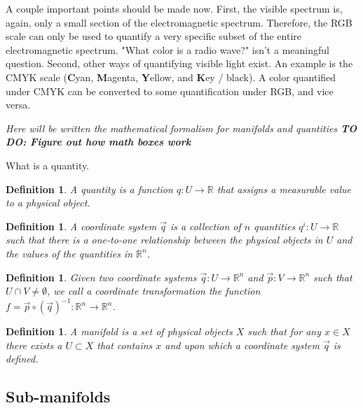 \documentclass{book}
\newtheorem{defn}[equation]{Definition}
\begin{document}
A couple important points should be made now. First, the visible spectrum is, again, only a small section of the electromagnetic spectrum. Therefore, the RGB scale can only be used to quantify a very specific subset of the entire electromagnetic spectrum. "What color is a radio wave?" isn't a meaningful question. Second, other ways of quantifying visible light exist. An example is the CMYK scale (\textbf{C}yan, \textbf{M}agenta, \textbf{Y}ellow, and \textbf{K}ey / black). A color quantified under CMYK can be converted to some quantification under RGB, and vice versa. 

\emph{Here will be written the mathematical formalism for manifolds and quantities
	\textbf{TO DO: Figure out how math boxes work}}


What is a quantity.

\begin{defn}
	A quantity is a function $q : U \to \mathbb{R}$ that assigns a measurable value to a physical object.
\end{defn}

\begin{defn}
	A coordinate system $\vec{q}$ is a collection of $n$ quantities $q^i : U \to \mathbb{R}$ such that there is a one-to-one relationship between the physical objects in $U$ and the values of the quantities in $\mathbb{R}^n$.
\end{defn}

\begin{defn}
	Given two coordinate systems  $\vec{q} : U \to \mathbb{R}^n$ and $\vec{p} : V \to \mathbb{R}^n$ such that $U \cap V \neq \emptyset$, we call a coordinate transformation the function $f = \vec{p} \circ (\vec{q})^{-1} : \mathbb{R}^n \to \mathbb{R}^n$.
\end{defn}

\begin{defn}
	A manifold is a set of physical objects $X$ such that for any $x \in X$ there exists a $U \subset X$ that contains $x$ and upon which a coordinate system $\vec{q}$ is defined.
\end{defn}

\subsection{Sub-manifolds}
\end{document}
